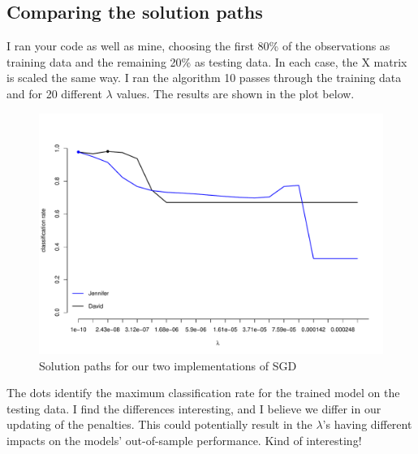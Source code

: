 \documentclass[paper=a4, fontsize=11pt]{scrartcl} %
\numberwithin{equation}{section} %
\numberwithin{figure}{section} %
\numberwithin{table}{section} %
\begin{document}
\newpage
\subsection{Comparing the solution paths}

I ran your code as well as mine, choosing the first 80\% of the observations as training data and the remaining 20\% as testing data.  In each case, the X matrix is scaled the same way.  I ran the algorithm 10 passes through the training data and for 20 different $\lambda$ values.  The results are shown in the plot below.

\begin{figure}[h]
\centering
	\includegraphics[scale=0.62]{SolutionPathCompare}\caption{Solution paths for our two implementations of SGD}
\end{figure}

The dots identify the maximum classification rate for the trained model on the testing data.  I find the differences interesting, and I believe we differ in our updating of the penalties.  This could potentially result in the $\lambda$'s having different impacts on the models' out-of-sample performance. Kind of interesting!
\end{document}
